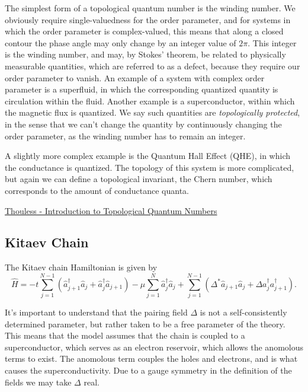 The simplest form of a topological quantum number is the winding number. We obviously require single-valuedness for the order parameter, and for systems in which the order parameter is complex-valued, this means that along a closed contour the phase angle may only change by an integer value of $2\pi$. This integer is the winding number, and may, by Stokes' theorem, be related to physically measurable quantities, which are referred to as a defect, because they require our order parameter to vanish. An example of a system with complex order parameter is a superfluid, in which the corresponding quantized quantity is circulation within the fluid. Another example is a superconductor, within which the magnetic flux is quantized. We say such quantities are \textit{topologically protected}, in the sense that we can't change the quantity by continuously changing the order parameter, as the winding number has to remain an integer. 

A slightly more complex example is the Quantum Hall Effect (QHE), in which the conductance is quantized. The topology of this system is more complicated, but again we can define a topological invariant, the Chern number, which corresponds to the amount of conductance quanta.

\begin{tcolorbox}[title = Sources, colback = gray!5, colframe = gray]
    \href{file:/Users/jobenning/Library/Mobile\ Documents/com\~apple\~CloudDocs/Desktop/Books\ \&\ Papers/Papers/Thouless\ -\ Introduction\ to\ Topological\ Quantum\ Numbers.pdf}{Thouless - Introduction to Topological Quantum Numbers}
\end{tcolorbox}

\subsection{Kitaev Chain}
The Kitaev chain Hamiltonian is given by
\begin{equation}
    \hat{H} = -t\sum_{j=1}^{N-1}(\hat{a}^\dagger_{j+1}\hat{a}_j+\hat{a}_j^\dagger \hat{a}_{j+1}) - \mu \sum_{j=1}^N\hat{a}^\dagger_j \hat{a}_j + \sum_{j=1}^{N-1}(\Delta^* \hat{a}_{j+1}\hat{a}_j + \Delta a_j^\dagger a_{j+1}^\dagger).
\end{equation}

It's important to understand that the pairing field $\Delta$ is not a self-consistently determined parameter, but rather taken to be a free parameter of the theory. This means that the model assumes that the chain is coupled to a superconductor, which serves as an electron reservoir, which allows the anomolous terms to exist. The anomolous term couples the holes and electrons, and is what causes the superconductivity. Due to a gauge symmetry in the definition of the fields we may take $\Delta$ real. 

